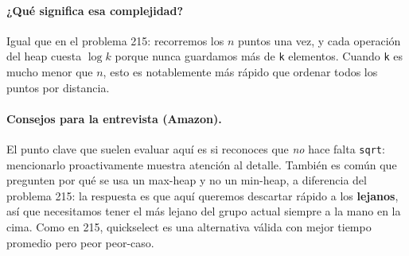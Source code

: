 


\paragraph{¿Qué significa esa complejidad?} Igual que en el problema 215:
recorremos los $n$ puntos una vez, y cada operación del heap cuesta
$\log k$ porque nunca guardamos más de \texttt{k} elementos. Cuando
\texttt{k} es mucho menor que $n$, esto es notablemente más rápido que
ordenar todos los puntos por distancia.

\paragraph{Consejos para la entrevista (Amazon).} El punto clave que suelen
evaluar aquí es si reconoces que \emph{no} hace falta \texttt{sqrt}: mencionarlo
proactivamente muestra atención al detalle. También es común que pregunten
por qué se usa un max-heap y no un min-heap, a diferencia del problema 215:
la respuesta es que aquí queremos descartar rápido a los \textbf{lejanos},
así que necesitamos tener el más lejano del grupo actual siempre a la mano
en la cima. Como en 215, quickselect es una alternativa válida con mejor
tiempo promedio pero peor peor-caso.
